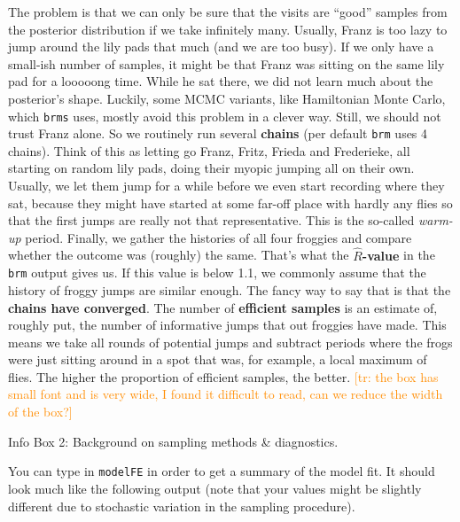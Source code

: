 \documentclass[nobib]{tufte-handout}
\newcommand{\tr}[1]{\textcolor{DarkOrange}{[tr: #1]}}
\begin{document}
\begin{InfoBox}[]
{\begin{minipage}{1.5\textwidth}
    The problem is that we can only be sure that the visits are ``good'' samples from the posterior
    distribution if we take infinitely many. Usually, Franz is too lazy to jump around the lily pads that much (and we are too busy). If we only have a small-ish number of samples, it might be that
    Franz was sitting on the same lily pad for a looooong time. While he
    sat there, we did not learn much about the posterior's shape. Luckily, some MCMC variants, like Hamiltonian Monte Carlo, which \texttt{brms} uses, mostly avoid this problem in a clever way. Still, we should not trust Franz alone. So we routinely run several
    \textbf{chains} (per default \texttt{brm} uses 4 chains). Think of this as letting go Franz,
    Fritz, Frieda and Frederieke, all starting on random lily pads, doing their myopic jumping
    all on their own. Usually, we let them jump for a while before we even start recording
    where they sat, because they might have started at some far-off place with hardly any flies so that the first jumps are really not that representative. This is the so-called
    \emph{warm-up} period. Finally, we gather the histories of all four froggies and compare
    whether the outcome was (roughly) the same. That's what the \textbf{$\hat{R}$-value} in the
    \texttt{brm} output gives us. If this value is below 1.1, we commonly assume that the
    history of froggy jumps are similar enough. The fancy way to say that is that the \textbf{chains have
      converged}. The number of \textbf{efficient samples} is an estimate of, roughly put, the
    number of informative jumps that out froggies have made. This means we take all rounds of potential jumps and subtract periods where the frogs
    were just sitting around in a spot that was, for example, a local maximum of flies. The
    higher the proportion of efficient samples, the better.
    \tr{the box has small font and is very wide, I found it difficult to read, can we reduce the width of the box?}
    
  \end{minipage} \par
  } \par
  \begin{center}
    Info Box 2: Background on sampling methods \& diagnostics.
  \end{center}
\end{InfoBox}


You can type in \texttt{modelFE} in order to get a summary of the model fit. It should look much like the following output (note that your  values might be slightly different due to stochastic variation in the sampling procedure).
\end{document}
